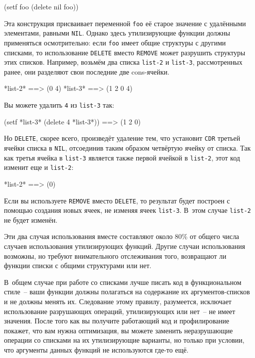 \begin{myverb}
(setf foo (delete nil foo))
\end{myverb}

Эта конструкция присваивает переменной \lstinline{foo} её старое значение с удалёнными
элементами, равными \lstinline{NIL}. Однако здесь утилизирующие функции должны применяться
осмотрительно: если \lstinline{foo} имеет общие структуры с другими списками, то использование
\lstinline{DELETE} вместо \lstinline{REMOVE} может разрушить структуры этих списков. Например,
возьмём два списка \lstinline{list-2} и \lstinline{list-3}, рассмотренных ранее, они разделяют свои
последние две cons-ячейки.

\begin{myverb}
*list-2* ==> (0 4)
*list-3* ==> (1 2 0 4)
\end{myverb}

Вы можете удалить \lstinline{4} из \lstinline{list-3} так:

\begin{myverb}
(setf *list-3* (delete 4 *list-3*)) ==> (1 2 0)
\end{myverb}

Но \lstinline{DELETE}, скорее всего, произведёт удаление тем, что установит \lstinline{CDR} третьей
ячейки списка в \lstinline{NIL}, отсоединив таким образом четвёртую ячейку от
списка. Так как третья ячейка в \lstinline{list-3} является также первой ячейкой в \lstinline{list-2},
этот код изменит еще и \lstinline{list-2}:

\begin{myverb}
*list-2* ==> (0)
\end{myverb}

Если вы используете \lstinline{REMOVE} вместо \lstinline{DELETE}, то результат будет построен с
помощью создания новых ячеек, не изменяя ячеек \lstinline{list-3}. В~этом случае \lstinline{list-2}
не будет изменён.

Эти два случая использования вместе составляют около 80\% от общего числа случаев
использования утилизирующих функций. Другие случаи использования возможны, но требуют
внимательного отслеживания того, возвращают ли функции списки с общими структурами или нет.

В~общем случае при работе со списками лучше писать код в функциональном стиле~-- ваши
функции должны полагаться на содержание их аргументов-списков и не должны менять
их. Следование этому правилу, разумеется, исключает использование разрушающих операций,
утилизирующих или нет~-- не имеет значения. После того как вы получите работающий код и
профилирование покажет, что вам нужна оптимизация, вы можете заменить неразрушающие
операции со списками на их утилизирующие варианты, но только при условии, что аргументы
данных функций не используются где-то ещё.

